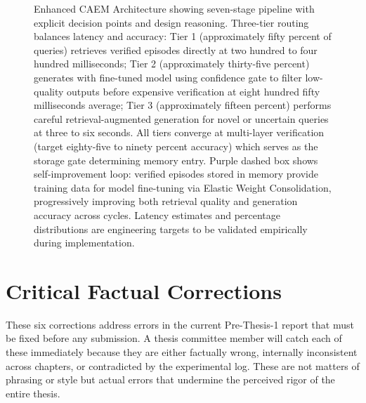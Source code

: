 \documentclass[11pt,a4paper]{article}
\begin{document}
\begin{figure}[p]
\vspace{0.4cm}

{\small\caption[Enhanced CAEM Architecture]{Enhanced CAEM Architecture showing seven-stage pipeline with explicit decision points and design reasoning. Three-tier routing balances latency and accuracy: Tier 1 (approximately fifty percent of queries) retrieves verified episodes directly at two hundred to four hundred milliseconds; Tier 2 (approximately thirty-five percent) generates with fine-tuned model using confidence gate to filter low-quality outputs before expensive verification at eight hundred fifty milliseconds average; Tier 3 (approximately fifteen percent) performs careful retrieval-augmented generation for novel or uncertain queries at three to six seconds. All tiers converge at multi-layer verification (target eighty-five to ninety percent accuracy) which serves as the storage gate determining memory entry. Purple dashed box shows self-improvement loop: verified episodes stored in memory provide training data for model fine-tuning via Elastic Weight Consolidation, progressively improving both retrieval quality and generation accuracy across cycles. Latency estimates and percentage distributions are engineering targets to be validated empirically during implementation.}}
\label{fig:architecture-enhanced}
\end{figure}

\newpage

\section{Critical Factual Corrections}
\label{sec:corrections}

These six corrections address errors in the current Pre-Thesis-1 report that must be fixed before any submission. A thesis committee member will catch each of these immediately because they are either factually wrong, internally inconsistent across chapters, or contradicted by the experimental log. These are not matters of phrasing or style but actual errors that undermine the perceived rigor of the entire thesis.
\end{document}
